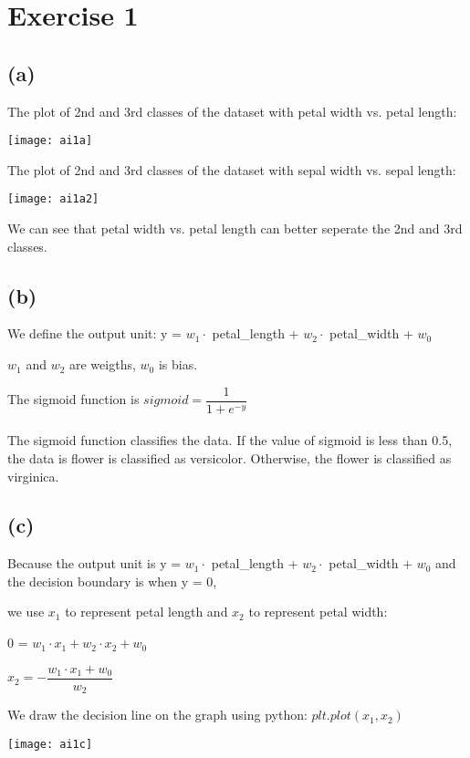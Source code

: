 \documentclass[11pt]{article}
\begin{document}
\section*{Exercise 1}

\subsection*{(a)}

The plot of 2nd and 3rd classes of the dataset with petal width vs. petal length:

\texttt{[image: ai1a]}

The plot of 2nd and 3rd classes of the dataset with sepal width vs. sepal length:

\texttt{[image: ai1a2]}

We can see that petal width vs. petal length can better seperate the 2nd and 3rd classes.

\subsection*{(b)}

We define the output unit: y = $w_1 \cdot$ petal\_length + $w_2 \cdot$ petal\_width + $w_0$

$w_1$ and $w_2$ are weigths, $w_0$ is bias.

The sigmoid function is $sigmoid = \dfrac{1}{1 + e^{-y}}$
\\\\
The sigmoid function classifies the data. If the value of sigmoid is less than 0.5, the data is flower is classified as versicolor.
Otherwise, the flower is classified as virginica. 

\subsection*{(c)}

Because the output unit is y = $w_1 \cdot$ petal\_length + $w_2 \cdot$ petal\_width + $w_0$ and the decision boundary is when y = 0, 

we use $x_1$ to represent petal length and $x_2$ to represent petal width: 

0 = $w_1 \cdot x_1 + w_2 \cdot x_2 + w_0$ 

$x_2 = -\dfrac{w_1 \cdot x_1 + w_0}{w_2}$

We draw the decision line on the graph using python: $plt.plot(x_1, x_2)$

\texttt{[image: ai1c]}
\end{document}
